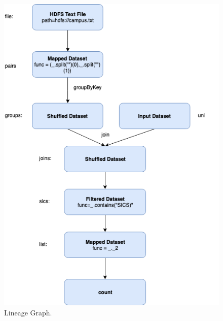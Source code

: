 \documentclass[12pt]{article}
\begin{document}
\begin{enumerate}
  \begin{figure}
    \includegraphics[width=\linewidth]{lineage_graph.png}
    \caption{Lineage Graph.}
    \label{fig:lineage_graph}
  \end{figure}

\end{enumerate}
\end{document}

